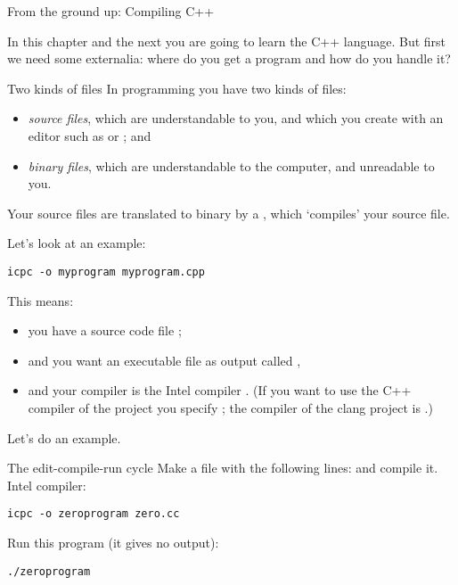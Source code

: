 
 {From the ground up: Compiling C++}

In this chapter and the next you are going to learn the C++
language. But first we need some externalia:
where do you get a program and how do you handle it?

\begin{block}{Two kinds of files}
  \label{sl:sourcebinary}
  In programming you have two kinds of files:
  \begin{itemize}
  \item \emph{source files}, which are understandable
    to you, and which you create with an editor such as  or
    ; and
  \item \emph{binary files}, which are understandable
    to the computer, and unreadable to you.
  \end{itemize}
  Your source files are translated to binary by a
  , which `compiles' your source file.
\end{block}

Let's look at an example:
\begin{verbatim}
icpc -o myprogram myprogram.cpp
\end{verbatim}
This means:
\begin{itemize}
\item you have a source code file ;
\item and you want an executable file as output called ,
\item and your compiler is the Intel compiler .
  (If you want to use the C++ compiler of the
   project you specify ;
  the compiler of the clang project is .)
\end{itemize}

Let's do an example.

\begin{exercise}{The edit-compile-run cycle}
\label{ex:compile-cycle}
  Make a file  with the following lines:
  and compile it. Intel compiler:
\begin{verbatim}
icpc -o zeroprogram zero.cc
\end{verbatim}
Run this program (it gives no output):
\begin{verbatim}
./zeroprogram
\end{verbatim}
\end{exercise}

